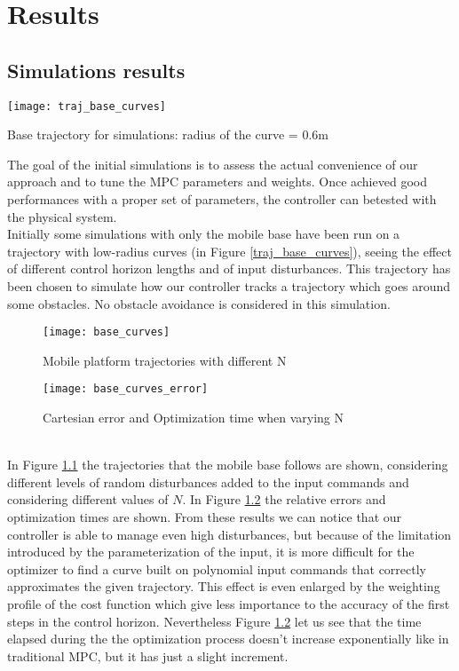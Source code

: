 
\chapter{Results}
\label{chapter7}
\section{Simulations results}
\begin{floatingfigure}[r]{.33\textwidth}
	\centering
	\texttt{[image: traj\_base\_curves]}
	\caption{Base trajectory for simulations: radius of the curve = 0.6m\label{traj_base_curves}}
\end{floatingfigure}
The goal of the initial simulations is to assess the actual convenience of our approach and to tune the MPC parameters and weights. Once achieved good performances with a proper set of parameters, the controller can betested with the physical system.\\
Initially some simulations with only the mobile base have been run on a trajectory with low-radius curves (in Figure \ref{traj_base_curves}), seeing the effect of different control horizon lengths and of input disturbances. This trajectory has been chosen to simulate how our controller tracks a trajectory which goes around some obstacles. No obstacle avoidance is considered in this simulation.
\begin{figure}[!h]
	\centering
	\texttt{[image: base\_curves]}
	\caption{Mobile platform trajectories with different N}
	\label{base_curves}
\end{figure}
\begin{figure}[!h]
	\texttt{[image: base\_curves\_error]}
	\centering
	\caption{Cartesian error and Optimization time when varying N}
	\label{base_curves_errors}
\end{figure}
\\In Figure \ref{base_curves} the trajectories that the mobile base follows are shown, considering different levels of random disturbances added to the input commands and considering different values of $N$. In Figure \ref{base_curves_errors} the relative errors and optimization times are shown. From these results we can notice that our controller is able to manage even high disturbances, but because of the limitation introduced by the parameterization of the input, it is more difficult for the optimizer to find a curve built on polynomial input commands that correctly approximates the given trajectory. This effect is even enlarged by the weighting profile of the cost function which give less importance to the accuracy of the first steps in the control horizon. Nevertheless Figure \ref{base_curves_errors} let us see that the time elapsed during the the optimization process doesn't increase exponentially like in traditional MPC, but it has just a slight increment.\\
